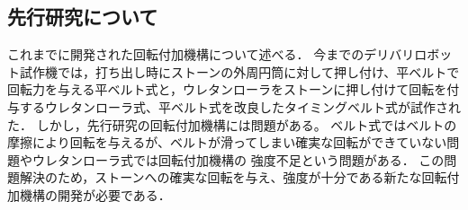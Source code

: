 \documentclass{classes/sice-si}
\begin{document}
\subsection{先行研究について}
これまでに開発された回転付加機構について述べる．
今までのデリバリロボット試作機では，打ち出し時にストーンの外周円筒に対して押し付け、平ベルトで回転力を与える平ベルト式\cite{ref:sankou}と，ウレタンローラをストーンに押し付けて回転を付与するウレタンローラ式、平ベルト式を改良したタイミングベルト式が試作された．
しかし，先行研究の回転付加機構には問題がある。
ベルト式ではベルトの摩擦により回転を与えるが、ベルトが滑ってしまい確実な回転ができていない問題やウレタンローラ式では回転付加機構の
強度不足という問題がある．
この問題解決のため，ストーンへの確実な回転を与え、強度が十分である新たな回転付加機構の開発が必要である．
\end{document}
